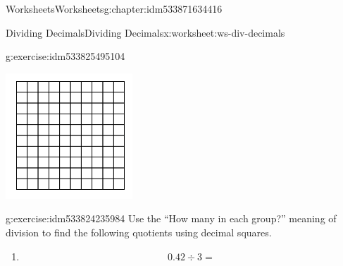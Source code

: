 \documentclass[twoside,11pt,]{book}
\begin{document}
\begin{chapterptx}{Worksheets}{}{Worksheets}{}{}{g:chapter:idm533871634416}
\begin{worksheet-section-numberless}{Dividing Decimals}{}{Dividing Decimals}{}{}{x:worksheet:ws-div-decimals}
\begin{divisionexercise}{1}{}{}{g:exercise:idm533825495104}
\begin{enumerate}[label=(\alph*)]
\begin{sidebyside}{1}{0.3}{0.3}{0}
\begin{sbspanel}{0.4}
\includegraphics[width=1\linewidth]{images/decimal-square.png}
\end{sbspanel}%
\end{sidebyside}%
%
\end{enumerate}
\end{divisionexercise}%
\clearpage
\begin{divisionexercise}{2}{}{}{g:exercise:idm533824235984}%
Use the ``How many in each group?''  meaning of division to find the following quotients using decimal squares.%
%
\begin{enumerate}[label=(\alph*)]
\item{}%
\begin{equation*}
0.42 \div 3 = 
\end{equation*}
\begin{sidebyside}{1}{0.3}{0.3}{0}%
\begin{sbspanel}{0.4}%

\end{sbspanel}
\end{sidebyside}
\end{enumerate}
\end{divisionexercise}
\end{worksheet-section-numberless}
\end{chapterptx}
\end{document}
